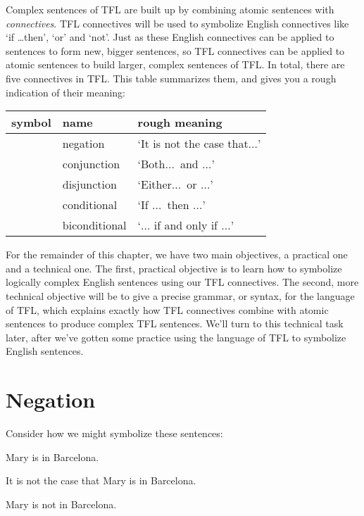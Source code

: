 Complex sentences of TFL are built up by combining atomic sentences with \emph{connectives}.  TFL connectives will be used to symbolize English connectives like `if \ldots then', `or' and `not'.  Just as these English connectives can be applied to sentences to form new, bigger sentences, so TFL connectives can be applied to atomic sentences to build larger, complex sentences of TFL.  In total, there are five connectives in TFL. This table summarizes them, and gives you a rough indication of their meaning:


	\begin{table}[h]
	\center
	\begin{tabular}{l l l}

	\textbf{symbol}&\textbf{name}&\textbf{rough meaning}\\
	\hline
	\enot&negation&`It is not the case that$\ldots$'\\
	\eand&conjunction&`Both$\ldots$\ and $\ldots$'\\
	\eor&disjunction&`Either$\ldots$\ or $\ldots$'\\
	\eif&conditional&`If $\ldots$\ then $\ldots$'\\
	\eiff&biconditional&`$\ldots$ if and only if $\ldots$'\\

	\end{tabular}
	\end{table}

For the remainder of this chapter, we have two main objectives, a practical one and a technical one.  The first, practical objective is to learn how to symbolize logically complex English sentences using our TFL connectives.  The second, more technical objective will be to give a precise grammar, or syntax, for the language of TFL, which explains exactly how TFL connectives combine with atomic sentences to produce complex TFL sentences.  We'll turn to this technical task later, after we've gotten some practice using the language of TFL to symbolize English sentences.

\section{Negation}

Consider how we might symbolize these sentences:

	\begin{earg}
	\item[\ex{not1}] Mary is in Barcelona.
	\item[\ex{not2}] It is not the case that Mary is in Barcelona.
	\item[\ex{not3}] Mary is not in Barcelona.
	\end{earg}

